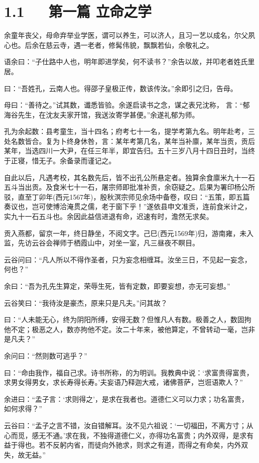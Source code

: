 \documentclass[letterpaper,10pt,english]{sphinxmanual}
\begin{document}
\section{1.1   第一篇 立命之学}
\label{\detokenize{p00_u5176_u5b83/_u8881_u4e86_u51e1-_u4e86_u51e1_u56db_u8bad:id3}}
余童年丧父，母命弃举业学医，谓可以养生，可以济人，且习一艺以成名，尔父夙心也。后余在慈云寺，遇一老者，修髯伟貌，飘飘若仙，余敬礼之。

语余曰：“子仕路中人也，明年即进学矣，何不读书？”余告以故，并叩老者姓氏里居。

曰：“吾姓孔，云南人也。得邵子皇极正传，数该传汝。”余即引之归，告母。

母曰：“善待之。”试其数，谶悉皆验。余遂启读书之念，谋之表兄沈称， 言：“郁海谷先生，在沈友夫家开馆，我送汝寄学甚便。”余遂礼郁为师。

孔为余起数：县考童生，当十四名；府考七十一名，提学考第九名。明年赴考，三处名数皆合。复为卜终身休咎，言：某年考第几名，某年当补廪，某年当贡，贡后某年，当选四川一大尹，在任三年半，即宜告归。五十三岁八月十四日丑时，当终于正寝，惜无子。余备录而谨记之。

自此以后，凡遇考校，其名数先后，皆不出孔公所悬定者。独算余食廪米九十一石五斗当出贡。及食米七十一石，屠宗师即批准补贡，余窃疑之。后果为署印杨公所驳，直至丁卯年(西元1567年)，殷秋溟宗师见余场中备卷，叹曰：“五策，即五篇奏议也，岂可使博洽淹贯之儒，老于窗下乎！”遂依县申文准贡，连前食米计之，实九十一石五斗也。余因此益信进退有命，迟速有时，澹然无求矣。

贡入燕都，留京一年，终日静坐，不阅文字。己巳(西元1569年)归，游南雍，未入监，先访云谷会禅师于栖霞山中，对坐一室，凡三昼夜不瞑目。

云谷问曰：“凡人所以不得作圣者，只为妄念相缠耳。汝坐三日，不见起一妄念，何也？”

余曰：“吾为孔先生算定，荣辱生死，皆有定数，即要妄想，亦无可妄想。”

云谷笑曰：“我待汝是豪杰，原来只是凡夫。”问其故？

曰：“人未能无心，终为阴阳所缚，安得无数？但惟凡人有数。极善之人，数固拘他不定；极恶之人，数亦拘他不定。汝二十年来，被他算定，不曾转动一毫，岂非是凡夫？”

余问曰：“然则数可逃乎？”

曰：“命由我作，福自己求。诗书所称，的为明训。我教典中说：‘求富贵得富贵，求男女得男女，求长寿得长寿。’夫妄语乃释迦大戒，诸佛菩萨，岂诳语欺人？”

余进曰：“孟子言：‘求则得之’，是求在我者也。道德仁义可以力求；功名富贵，如何求得？”

云谷曰：“孟子之言不错，汝自错解耳。汝不见六祖说：‘一切福田，不离方寸；从心而觅，感无不通。’求在我，不独得道德仁义，亦得功名富贵；内外双得，是求有益于得也。若不反躬内省，而徒向外驰求，则求之有道，而得之有命矣，内外双失，故无益。”
\end{document}
